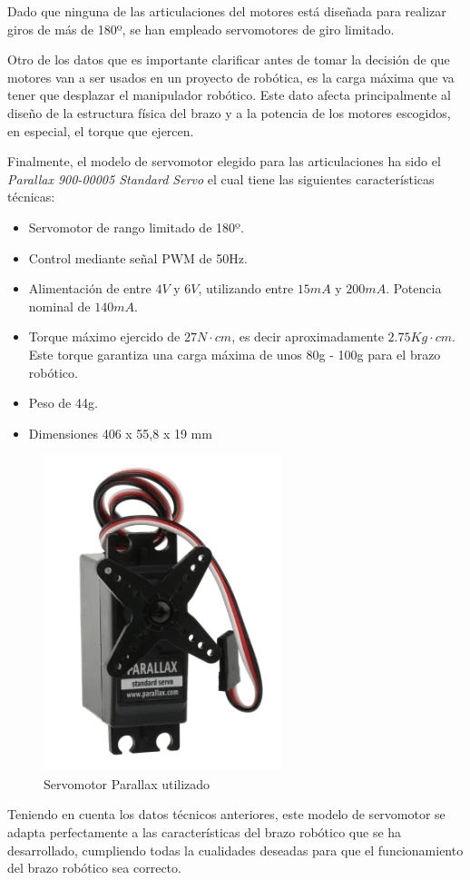 Dado que ninguna de las articulaciones del motores está diseñada para realizar giros de más de 180º, se han empleado servomotores de giro limitado.

Otro de los datos que es importante clarificar antes de tomar la decisión de que motores van a ser usados en un proyecto de robótica, es la carga máxima que va tener que desplazar el manipulador robótico. Este dato afecta principalmente al diseño de la estructura física del brazo y a la potencia de los motores escogidos, en especial, el torque que ejercen. 

Finalmente, el modelo de servomotor elegido para las articulaciones ha sido el \textit{Parallax 900-00005 Standard Servo} el cual tiene las siguientes características técnicas:

\begin{itemize}
    \item Servomotor de rango limitado de 180º.
    \item Control mediante señal \ac{PWM} de 50Hz.
    \item Alimentación de entre $4V$ y $6V$, utilizando entre $15mA$ y $200mA$. Potencia nominal de $140mA$.
    \item Torque máximo ejercido de $27N\cdot cm$, es decir aproximadamente $2.75 Kg\cdot cm$. Este torque garantiza una carga máxima de unos 80g - 100g para el brazo robótico.
    \item Peso de 44g.
    \item Dimensiones 406 x 55,8 x 19 mm
\end{itemize}

\begin{figure}[H]
    \centering 
    \includegraphics[width=.35\linewidth]{pictures/ServoParallax.PNG}
    \caption{Servomotor Parallax utilizado \cite{noauthor_900-00005_nodate}}
    \label{fig:}
\end{figure}

Teniendo en cuenta los datos técnicos anteriores, este modelo de servomotor se adapta perfectamente a las características del brazo robótico que se ha desarrollado, cumpliendo todas la cualidades deseadas para que el funcionamiento del brazo robótico sea correcto.